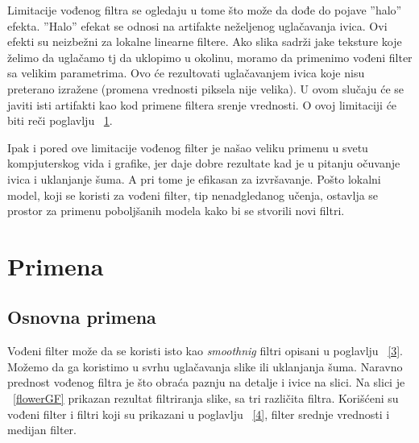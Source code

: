 \documentclass[a4paper,12pt,titlepage]{article}
\begin{document}
Limitacije vođenog filtra se ogledaju u tome što može da dođe do pojave ''halo'' efekta. ''Halo'' efekat se odnosi na artifakte neželjenog uglačavanja ivica. Ovi efekti su neizbežni za lokalne linearne filtere. Ako slika sadrži jake teksture koje želimo da uglačamo tj da uklopimo u okolinu, moramo da primenimo vođeni filter sa velikim parametrima. Ovo će rezultovati uglačavanjem ivica koje nisu preterano izražene (promena vrednosti piksela nije velika). U ovom slučaju će se javiti isti artifakti kao kod primene filtera srenje vrednosti. O ovoj limitaciji će biti reči poglavlju ~\ref{5}.

Ipak i pored ove limitacije vođenog filter je našao veliku primenu u svetu kompjuterskog vida i grafike, jer daje dobre rezultate kad je u pitanju očuvanje ivica i uklanjanje šuma. A pri tome je efikasan za izvršavanje. Pošto lokalni model, koji se koristi za vođeni filter, tip nenadgledanog učenja, ostavlja se prostor za primenu poboljšanih modela kako bi se stvorili novi filtri.  

\section{Primena}\label{5}%

\subsection{Osnovna primena}%

Vođeni filter može da se koristi isto kao \emph{smoothnig} filtri opisani u  poglavlju ~\ref{3}. Možemo da ga koristimo u svrhu uglačavanja slike ili uklanjanja šuma. Naravno prednost vođenog filtra je što obraća paznju na detalje i ivice na slici. Na slici je ~\ref{flowerGF} prikazan rezultat filtriranja slike, sa tri različita filtra. Korišćeni su vođeni filter i filtri koji su prikazani u poglavlju ~\ref{4}, filter srednje vrednosti i medijan filter. 
\end{document}
